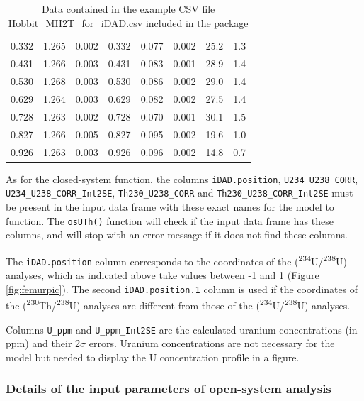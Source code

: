 \documentclass[]{elsarticle} %
\begin{document}
\begin{table}[ht]
\begin{tabular}{cccccccc}
  0.332 & 1.265 & 0.002 & 0.332 & 0.077 & 0.002 & 25.2 & 1.3 \\ 
  0.431 & 1.266 & 0.003 & 0.431 & 0.083 & 0.001 & 28.9 & 1.4 \\ 
  0.530 & 1.268 & 0.003 & 0.530 & 0.086 & 0.002 & 29.0 & 1.4 \\ 
  0.629 & 1.264 & 0.003 & 0.629 & 0.082 & 0.002 & 27.5 & 1.4 \\ 
  0.728 & 1.263 & 0.002 & 0.728 & 0.070 & 0.001 & 30.1 & 1.5 \\ 
  0.827 & 1.266 & 0.005 & 0.827 & 0.095 & 0.002 & 19.6 & 1.0 \\ 
  0.926 & 1.263 & 0.003 & 0.926 & 0.096 & 0.002 & 14.8 & 0.7 \\ 
   \hline
\end{tabular}
\caption{\label{tab:hobbitone}Data contained in the example CSV file Hobbit\_MH2T\_for\_iDAD.csv included in the package} 
\end{table}

As for the closed-system function, the columns \texttt{iDAD.position}, \texttt{U234\_U238\_CORR}, \texttt{U234\_U238\_CORR\_Int2SE}, \texttt{Th230\_U238\_CORR} and \texttt{Th230\_U238\_CORR\_Int2SE} must be present in the input data frame with these exact names for the model to function. The \texttt{osUTh()} function will check if the input data frame has these columns, and will stop with an error message if it does not find these columns.

The \texttt{iDAD.position} column corresponds to the coordinates of the (\textsuperscript{234}U/\textsuperscript{238}U) analyses, which as indicated above take values between -1 and 1 (Figure \ref{fig:femurpic}). The second \texttt{iDAD.position.1} column is used if the coordinates of the (\textsuperscript{230}Th/\textsuperscript{238}U) analyses are different from those of the (\textsuperscript{234}U/\textsuperscript{238}U) analyses.

Columns \texttt{U\_ppm} and \texttt{U\_ppm\_Int2SE} are the calculated uranium concentrations (in ppm) and their 2\(\sigma\) errors. Uranium concentrations are not necessary for the model but needed to display the U concentration profile in a figure.

\hypertarget{details-of-the-input-parameters-of-open-system-analysis}{%
\subsubsection{Details of the input parameters of open-system analysis}\label{details-of-the-input-parameters-of-open-system-analysis}}
\end{document}
